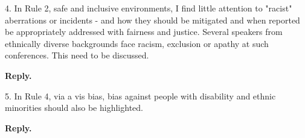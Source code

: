 \documentclass{article}
\newenvironment{Reply}{\noindent\color{BlueViolet}\textbf{Reply.}}{\vspace{1em}}
\begin{document}
4. In Rule 2, safe and inclusive environments, I find little attention to "racist" aberrations or incidents - and how they should be mitigated and when reported be appropriately addressed with fairness and justice.
Several speakers from ethnically diverse backgrounds face racism, exclusion or apathy at such conferences. This need to be discussed.

\begin{Reply}




\end{Reply}

5. In Rule 4, via a vis bias, bias against people with disability and ethnic minorities should also be highlighted.

\begin{Reply}


\end{Reply}
\end{document}
